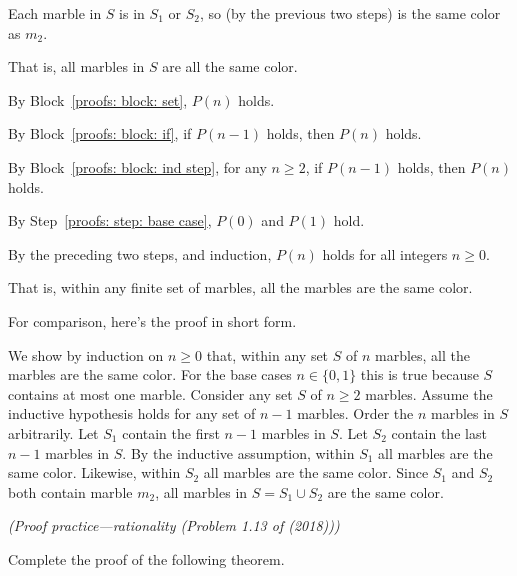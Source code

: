 \begin{longFormProof}
\begin{block}
\begin{block}
\begin{block}
        \step Each marble in $S$ is in $S_1$ or $S_2$,
        so (by the previous two steps)
        is the same color as $m_2$.

        \step That is, all marbles in $S$ are all the same color.

      \end{block}

      \step By Block~\ref{proofs: block: set}, $P(n)$ holds.
    \end{block}

    \step By Block~\ref{proofs: block: if},
    if $P(n-1)$ holds, then $P(n)$ holds.
  \end{block}

  \step By Block~\ref{proofs: block: ind step},
  for any $n\ge 2$,
  if $P(n-1)$ holds, then $P(n)$ holds.

  \step By Step~\ref{proofs: step: base case}, $P(0)$ and $P(1)$ hold.

  \step By the preceding two steps, and induction,
  $P(n)$ holds for all integers $n \ge 0$.

  \step That is, within any finite set of marbles,
  all the marbles are the same color.
\end{longFormProof}

For comparison, here's the proof in short form.

\begin{shortFormProof}
  We show by induction on $n\ge 0$ that,
  within any set $S$ of $n$ marbles, all the marbles are the same color.
  For the base cases $n\in\{0,1\}$ this is true because $S$ contains at most one marble.
  Consider any set $S$ of $n\ge 2$ marbles.
  Assume the inductive hypothesis holds for any set of $n-1$ marbles.
  Order the $n$ marbles in $S$ arbitrarily.
  Let $S_1$ contain the first $n-1$ marbles in $S$.
  Let $S_2$ contain the last $n-1$ marbles in $S$.
  By the inductive assumption, within $S_1$
  all marbles are the same color.
  Likewise, within $S_2$
  all marbles are the same color.
  Since $S_1$ and $S_2$ both contain marble $m_2$,
  all marbles in $S=S_1\cup S_2$ are the same color.
\end{shortFormProof}

\exercise \emph{(Proof practice---rationality (Problem 1.13 of \LLM (2018)))}

Complete the proof of the following theorem.

